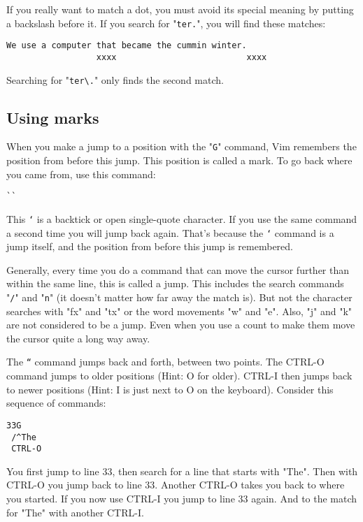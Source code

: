 If you really want to match a dot, you must avoid its special meaning by putting a backslash before it.
If you search for "\texttt{ter.}", you will find these matches:

		\begin{Verbatim}[samepage=true]
    We use a computer that became the cummin winter. 
                  xxxx                          xxxx
		\end{Verbatim}

		Searching for "\texttt{ter\textbackslash{}.}" only finds the second match.

\subsection{Using marks}

When you make a jump to a position with the "\texttt{G}" command, Vim remembers the position from before this jump.
This position is called a mark.
To go back where you came from, use this command:

 \begin{Verbatim}[samepage=true]
 ``
 \end{Verbatim}

This \texttt{`} is a backtick or open single-quote character.
If you use the same command a second time you will jump back again.
That's because the \texttt{`} command is a jump itself, and the position from before this jump is remembered.

Generally, every time you do a command that can move the cursor further than within the same line, this is called a jump.
This includes the search commands "\texttt{/}" and "\texttt{n}" (it doesn't matter how far away the match is).
But not the character searches with "fx" and "tx" or the word movements "w" and "e".
Also, "j" and "k" are not considered to be a jump.
Even when you use a count to make them move the cursor quite a long way away.
 
The \texttt{``} command jumps back and forth, between two points.
The CTRL-O command jumps to older positions (Hint: O for older).
CTRL-I then jumps back to newer positions (Hint: I is just next to O on the keyboard).
Consider this sequence of commands:

 \begin{Verbatim}[samepage=true]
 33G
 /^The
 CTRL-O
 \end{Verbatim}

You first jump to line 33, then search for a line that starts with "The".
Then with CTRL-O you jump back to line 33.
Another CTRL-O takes you back to where you started.
If you now use CTRL-I you jump to line 33 again.
And to the match for "The" with another CTRL-I.

